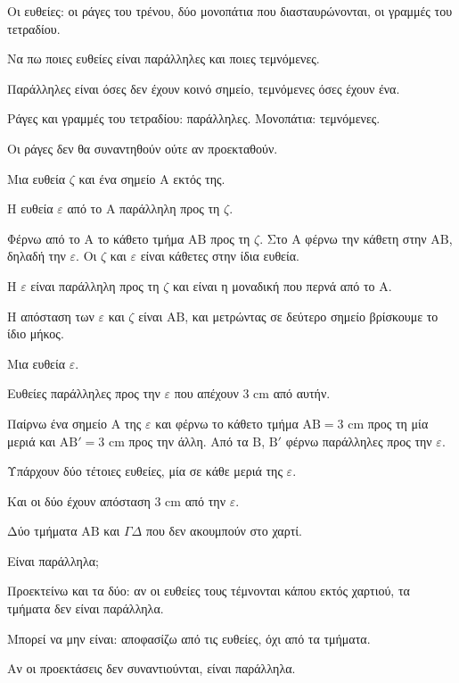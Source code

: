 
\tixero Οι ευθείες: οι ράγες του τρένου, δύο μονοπάτια που διασταυρώνονται, οι γραμμές του τετραδίου.\par
\tithelo Να πω ποιες ευθείες είναι παράλληλες και ποιες τεμνόμενες.\par
\possindeo Παράλληλες είναι όσες δεν έχουν κοινό σημείο, τεμνόμενες όσες έχουν ένα.\par
\apantisi Ράγες και γραμμές του τετραδίου: παράλληλες. Μονοπάτια: τεμνόμενες.\par
\elegxos Οι ράγες δεν θα συναντηθούν ούτε αν προεκταθούν.

\tixero Μια ευθεία $\zeta$ και ένα σημείο $\mathrm{Α}$ εκτός της.\par
\tithelo Η ευθεία $\varepsilon$ από το $\mathrm{Α}$ παράλληλη προς τη $\zeta$.\par
\possindeo Φέρνω από το $\mathrm{Α}$ το κάθετο τμήμα $\mathrm{ΑΒ}$ προς τη $\zeta$. Στο $\mathrm{Α}$ φέρνω την κάθετη στην $\mathrm{ΑΒ}$, δηλαδή την $\varepsilon$. Οι $\zeta$ και $\varepsilon$ είναι κάθετες στην ίδια ευθεία.\par
\apantisi Η $\varepsilon$ είναι παράλληλη προς τη $\zeta$ και είναι η μοναδική που περνά από το $\mathrm{Α}$.\par
\elegxos Η απόσταση των $\varepsilon$ και $\zeta$ είναι $\mathrm{ΑΒ}$, και μετρώντας σε δεύτερο σημείο βρίσκουμε το ίδιο μήκος.

\tixero Μια ευθεία $\varepsilon$.\par
\tithelo Ευθείες παράλληλες προς την $\varepsilon$ που απέχουν $3$ cm από αυτήν.\par
\possindeo Παίρνω ένα σημείο $\mathrm{Α}$ της $\varepsilon$ και φέρνω το κάθετο τμήμα $\mathrm{ΑΒ}=3$ cm προς τη μία μεριά και $\mathrm{ΑΒ}'=3$ cm προς την άλλη. Από τα $\mathrm{Β}$, $\mathrm{Β}'$ φέρνω παράλληλες προς την $\varepsilon$.\par
\apantisi Υπάρχουν δύο τέτοιες ευθείες, μία σε κάθε μεριά της $\varepsilon$.\par
\elegxos Και οι δύο έχουν απόσταση $3$ cm από την $\varepsilon$.

\tixero Δύο τμήματα $\mathrm{ΑΒ}$ και $\Gamma\Delta$ που δεν ακουμπούν στο χαρτί.\par
\tithelo Είναι παράλληλα;\par
\possindeo Προεκτείνω και τα δύο: αν οι ευθείες τους τέμνονται κάπου εκτός χαρτιού, τα τμήματα δεν είναι παράλληλα.\par
\apantisi Μπορεί να μην είναι: αποφασίζω από τις ευθείες, όχι από τα τμήματα.\par
\elegxos Αν οι προεκτάσεις δεν συναντιούνται, είναι παράλληλα.

